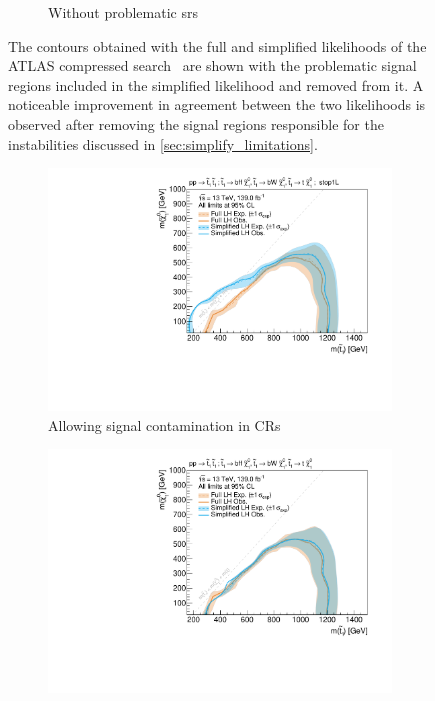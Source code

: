 \begin{figure}[H]
\begin{subfigure}[b]{0.47\textwidth}
		\caption{Without problematic \glspl{sr}\label{fig:exclusion_compressed_CLs_noLabel_v2_withoutCRs}}
	\end{subfigure}\hfill
	\caption{The contours obtained with the full and simplified likelihoods of the ATLAS compressed search~\cite{SUSY-2018-16} are shown with the problematic signal regions  included in the simplified likelihood and  removed from it. A noticeable improvement in agreement between the two likelihoods is observed after removing the signal regions responsible for the instabilities discussed in \cref{sec:simplify_limitations}.}\label{fig:limitations_simplied_compressed}
\end{figure}
\begin{figure}[H]
	\centering
		\captionsetup[subfigure]{aboveskip=-3pt,belowskip=-2pt}
	\begin{subfigure}[b]{0.47\textwidth}
		\centering\includegraphics[width=\textwidth]{exclusion_stop1L_withCRs_noLabel_v2}
		\caption{Allowing signal contamination in CRs\label{fig:exclusion_stop1L_noLabel_v2_withCRs}}
	\end{subfigure}\hfill
	\begin{subfigure}[b]{0.47\textwidth}
		\centering\includegraphics[width=\textwidth]{exclusion_stop1L_noLabel_v2}

\end{subfigure}
\end{figure}
